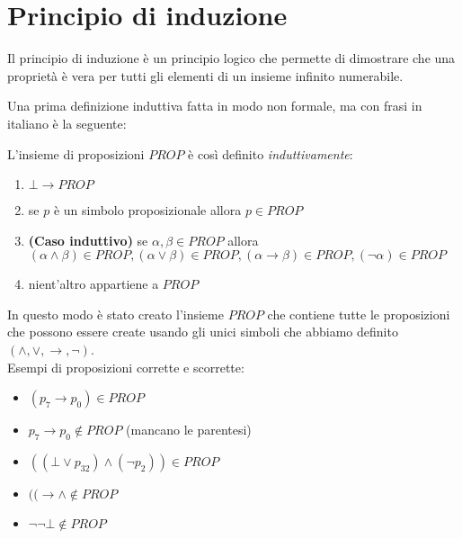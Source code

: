 \documentclass{article}
\theoremstyle{break}
\theoremstyle{break}
\theoremstyle{break}
\theoremstyle{break}
\begin{document}
\section{Principio di induzione}
Il principio di induzione è un principio logico che permette di dimostrare che una proprietà è vera
per tutti gli elementi di un insieme infinito numerabile.

Una prima definizione induttiva fatta in modo non formale, ma con frasi in italiano è la seguente:

L'insieme di proposizioni \( PROP \) è così definito \emph{induttivamente}:
\begin{enumerate}
  \item \( \bot \to PROP \)
  \item se \( p \) è un simbolo proposizionale allora \( p \in PROP \)
  \item \textbf{(Caso induttivo)} se \( \alpha, \beta \in PROP \) allora
    \( (\alpha \wedge \beta ) \in PROP, (\alpha \vee \beta ) \in PROP,
    (\alpha \to \beta ) \in PROP, (\neg \alpha ) \in PROP \)
  \item nient'altro appartiene a \( PROP \)
\end{enumerate}

In questo modo è stato creato l'insieme \( PROP \) che contiene tutte le proposizioni che possono essere create
usando gli unici simboli che abbiamo definito \( (\wedge, \vee, \to, \neg) \).
\vspace{0.5cm}
\\
Esempi di proposizioni corrette e scorrette:
\begin{itemize}
  \item \( (p_{7} \to p_{0}) \in PROP \)
  \item \( p_{7} \to p_{0} \notin PROP \) (mancano le parentesi)
  \item \( ((\bot \vee p_{32}) \wedge (\neg p_{2})) \in PROP \)
  \item \( ((\to \wedge \notin PROP \)
  \item \( \neg \neg \bot \notin PROP \)
\end{itemize}
\end{document}

